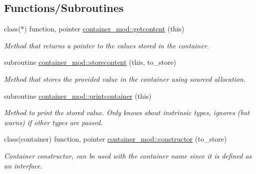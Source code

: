 \subsection*{Functions/\+Subroutines}
\begin{DoxyCompactItemize}
\item 
class($\ast$) function, pointer \mbox{\hyperlink{namespacecontainer__mod_a23a016e747d896622127c0c21dca9836}{container\+\_\+mod\+::getcontent}} (this)
\begin{DoxyCompactList}\small\item\em Method that returns a pointer to the values stored in the container. \end{DoxyCompactList}\item 
subroutine \mbox{\hyperlink{namespacecontainer__mod_ace49cee012b6cd3c41c03556ab0dd884}{container\+\_\+mod\+::storecontent}} (this, to\+\_\+store)
\begin{DoxyCompactList}\small\item\em Method that stores the provided value in the container using sourced allocation. \end{DoxyCompactList}\item 
subroutine \mbox{\hyperlink{namespacecontainer__mod_abf1785185971a527e437d3a489462724}{container\+\_\+mod\+::printcontainer}} (this)
\begin{DoxyCompactList}\small\item\em Method to print the stored value. Only knows about instrinsic types, ignores (but warns) if other types are passed. \end{DoxyCompactList}\item 
class(container) function, pointer \mbox{\hyperlink{namespacecontainer__mod_a6262df4ff34024d566cf8261dc20a248}{container\+\_\+mod\+::constructor}} (to\+\_\+store)
\begin{DoxyCompactList}\small\item\em Container constructor, can be used with the \textquotesingle{}container\textquotesingle{} name since it is defined as an interface. \end{DoxyCompactList}\end{DoxyCompactItemize}
